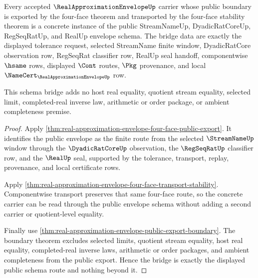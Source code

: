 \begin{theorem}
\label{thm:real-approximation-envelope-public-schema-bridge}
Every accepted $\RealApproximationEnvelopeUp$ carrier whose public boundary is exported by the four-face theorem and transported by the four-face stability theorem is a concrete instance of the public StreamNameUp, DyadicRatCoreUp, RegSeqRatUp, and RealUp envelope schema. The bridge data are exactly the displayed tolerance request, selected StreamName finite window, DyadicRatCore observation row, RegSeqRat classifier row, RealUp seal handoff, componentwise $\hsame$ rows, displayed $\Cont$ routes, $\Pkg$ provenance, and local $\NameCert_{\RealApproximationEnvelopeUp}$ row.

This schema bridge adds no host real equality, quotient stream equality, selected limit, completed-real inverse law, arithmetic or order package, or ambient completeness premise.
\end{theorem}
\begin{proof}
Apply \autoref{thm:real-approximation-envelope-four-face-public-export}. It identifies the public envelope as the finite route from the selected $\StreamNameUp$ window through the $\DyadicRatCoreUp$ observation, the $\RegSeqRatUp$ classifier row, and the $\RealUp$ seal, supported by the tolerance, transport, replay, provenance, and local certificate rows.

Apply \autoref{thm:real-approximation-envelope-four-face-transport-stability}. Componentwise transport preserves that same four-face route, so the concrete carrier can be read through the public envelope schema without adding a second carrier or quotient-level equality.

Finally use \autoref{thm:real-approximation-envelope-public-export-boundary}. The boundary theorem excludes selected limits, quotient stream equality, host real equality, completed-real inverse laws, arithmetic or order packages, and ambient completeness from the public export. Hence the bridge is exactly the displayed public schema route and nothing beyond it.
\end{proof}

